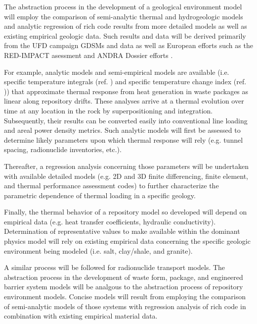 
The abstraction process in the development of a geological environment model 
will employ the comparison of semi-analytic thermal and hydrogeologic models and 
analytic regression of rich code results from more detailed models as well as 
existing empirical geologic data. Such results and data will be derived 
primarily from the \gls{UFD} campaign \glspl{GDSM} and  data as well as European 
efforts such as the RED-IMPACT asessment and \gls{ANDRA} Dossier efforts 
\cite{von_lensa_red-impact_2008, andra_argile:_2005, clayton_generic_2011} . 


For example, analytic models and semi-empirical models are available (i.e.  
specific temperature integrals (ref. \cite{li_methodology_2006}) and specific 
temperature change index (ref. \cite{radel_effect_2007})) that approximate 
thermal response from heat generation in waste packages as linear along 
repository drifts. These analyses arrive at a thermal evolution over time at any 
location in the rock by superpositioning and integration. Subsequently, their 
results can be converted easily into conventional line loading and areal power 
density metrics.  Such analytic models will first be assessed to determine 
likely parameters upon which thermal response will rely (e.g. tunnel spacing, 
radionuclide inventories, etc.).


Thereafter, a regression analysis concerning those parameters will be undertaken 
with available detailed models (e.g. 2D and 3D finite differencing, finite 
element, and thermal performance assessment codes) to further characterize the 
parametric dependence of thermal loading in a specific geology.  


Finally, the thermal behavior of a repository model so developed will depend on 
empirical data (e.g.  heat transfer coefficients, hydraulic conductivity).  
Determination of representative values to make available within the dominant 
physics model will rely on existing empirical data concerning the specific 
geologic environment being modeled (i.e. salt, clay/shale, and granite). 


A similar process will be followed for radionuclide transport models.  The 
abstraction process in the development of waste form, package, and engineered 
barrier system models will be analgous to the abstraction process of repository 
environment models. Concise models will result from employing the comparison of 
semi-analytic models of those systems with regression analysis of rich code in 
combination with existing empirical material data.

